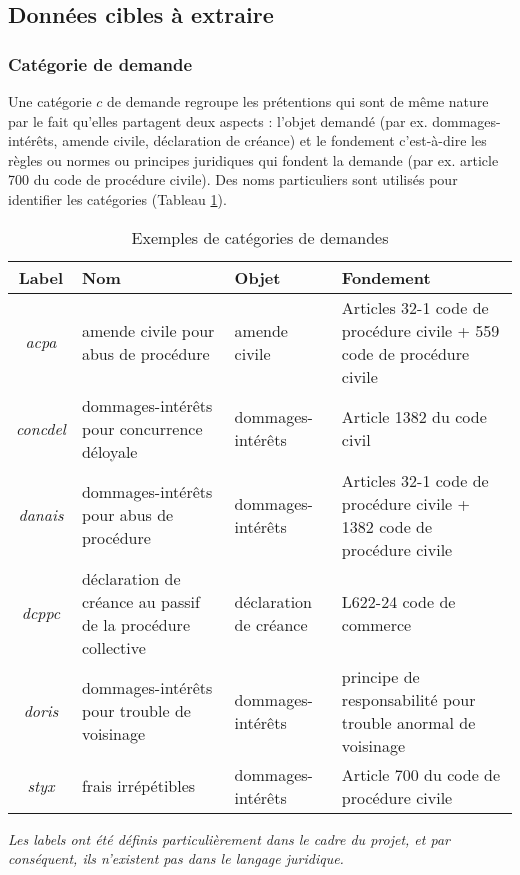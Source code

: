 \subsection{Données cibles à extraire}

\subsubsection{Catégorie de demande}

Une catégorie $c$ de demande regroupe les prétentions qui sont de même nature par le fait qu'elles partagent deux aspects : l'objet demandé (par ex. dommages-intérêts, amende civile, déclaration de créance) et le fondement c'est-à-dire les règles ou normes ou principes juridiques qui fondent la demande (par ex. article 700 du code de procédure civile). Des noms particuliers sont utilisés pour identifier les catégories (Tableau \ref{tab:quanta:exemple-categorie}).

\begin{table}[!htb]
\small
\begin{tabular}{|c|p{}|p{}|p{}|}
\hline
\textbf{Label} & \textbf{Nom} & \textbf{Objet} & \textbf{Fondement} \\ \hline
\textit{acpa} & amende civile pour abus de procédure & amende civile & Articles 32-1 code de procédure civile + 559 code de procédure civile \\ \hline
\textit{concdel} & dommages-intérêts pour concurrence déloyale & dommages-intérêts & Article 1382 du code civil \\ \hline
\textit{danais} & dommages-intérêts pour abus de procédure & dommages-intérêts & Articles 32-1 code de procédure civile + 1382 code de procédure civile \\ \hline
\textit{dcppc} & déclaration de créance au passif de la procédure collective & déclaration de créance & L622-24 code de commerce \\ \hline
\textit{doris} & dommages-intérêts pour trouble de voisinage & dommages-intérêts & principe de responsabilité pour trouble anormal de voisinage \\ \hline
\textit{styx} & frais irrépétibles & dommages-intérêts & Article 700 du code de procédure civile \\ \hline
\end{tabular}
\textit{Les labels ont été définis particulièrement dans le cadre du projet, et par conséquent, ils n'existent pas dans le langage juridique.}
\caption{Exemples de catégories de demandes}\label{tab:quanta:exemple-categorie}
\end{table}

